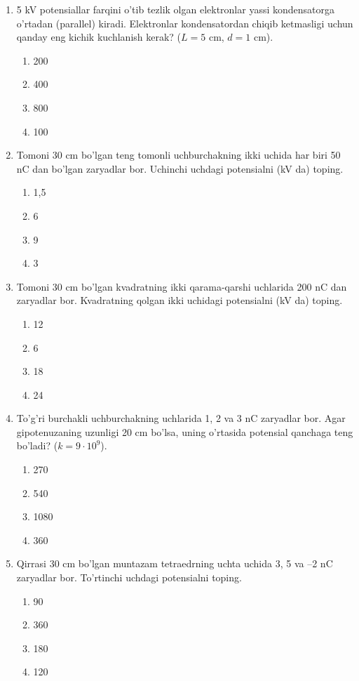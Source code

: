 \begin{enumerate}
    \item 5 kV potensiallar farqini o’tib tezlik olgan elektronlar yassi kondensatorga o’rtadan (parallel) kiradi. Elektronlar kondensatordan chiqib ketmasligi uchun qanday eng kichik kuchlanish kerak? ($L=5$ cm, $d=1$ cm).
    \begin{enumerate}[label=\Alph*)]
        \item 200
        \item 400 %
        \item 800
        \item 100
    \end{enumerate}

    \item Tomoni 30 cm bo’lgan teng tomonli uchburchakning ikki uchida har biri 50 nC dan bo’lgan zaryadlar bor. Uchinchi uchdagi potensialni (kV da) toping.
    \begin{enumerate}[label=\Alph*)]
        \item 1,5
        \item 6
        \item 9
        \item 3 %
    \end{enumerate}

    \item Tomoni 30 cm bo’lgan kvadratning ikki qarama-qarshi uchlarida 200 nC dan zaryadlar bor. Kvadratning qolgan ikki uchidagi potensialni (kV da) toping.
    \begin{enumerate}[label=\Alph*)]
        \item 12 %
        \item 6
        \item 18
        \item 24
    \end{enumerate}

    \item To’g’ri burchakli uchburchakning uchlarida 1, 2 va 3 nC zaryadlar bor. Agar gipotenuzaning uzunligi 20 cm bo’lsa, uning o’rtasida potensial qanchaga teng bo’ladi? ($k=9 \cdot 10^9$).
    \begin{enumerate}[label=\Alph*)]
        \item 270
        \item 540 %
        \item 1080
        \item 360
    \end{enumerate}

    \item Qirrasi 30 cm bo’lgan muntazam tetraedrning uchta uchida 3, 5 va –2 nC zaryadlar bor. To’rtinchi uchdagi potensialni toping.
    \begin{enumerate}[label=\Alph*)]
        \item 90
        \item 360
        \item 180 %
        \item 120
    \end{enumerate}


\end{enumerate}
